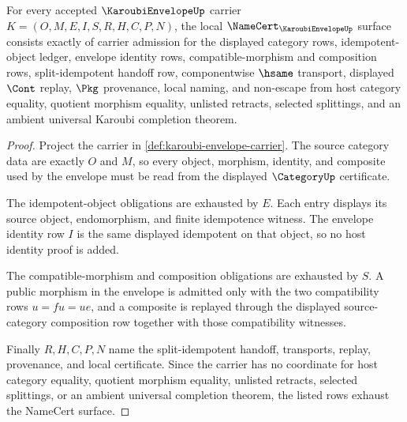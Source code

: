 \begin{theorem}
\label{thm:karoubi-envelope-namecert-obligations}
For every accepted $\KaroubiEnvelopeUp$ carrier $K=(O,M,E,I,S,R,H,C,P,N)$, the local $\NameCert_{\KaroubiEnvelopeUp}$ surface consists exactly of carrier admission for the displayed category rows, idempotent-object ledger, envelope identity rows, compatible-morphism and composition rows, split-idempotent handoff row, componentwise $\hsame$ transport, displayed $\Cont$ replay, $\Pkg$ provenance, local naming, and non-escape from host category equality, quotient morphism equality, unlisted retracts, selected splittings, and an ambient universal Karoubi completion theorem.
\end{theorem}
\begin{proof}
Project the carrier in \autoref{def:karoubi-envelope-carrier}. The source category data are exactly $O$ and $M$, so every object, morphism, identity, and composite used by the envelope must be read from the displayed $\CategoryUp$ certificate.

The idempotent-object obligations are exhausted by $E$. Each entry displays its source object, endomorphism, and finite idempotence witness. The envelope identity row $I$ is the same displayed idempotent on that object, so no host identity proof is added.

The compatible-morphism and composition obligations are exhausted by $S$. A public morphism in the envelope is admitted only with the two compatibility rows $u=fu=ue$, and a composite is replayed through the displayed source-category composition row together with those compatibility witnesses.

Finally $R,H,C,P,N$ name the split-idempotent handoff, transports, replay, provenance, and local certificate. Since the carrier has no coordinate for host category equality, quotient morphism equality, unlisted retracts, selected splittings, or an ambient universal completion theorem, the listed rows exhaust the NameCert surface.
\end{proof}

